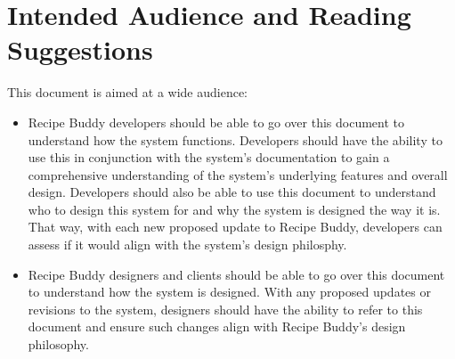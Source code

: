 \documentclass{scrreprt}
\begin{document}
\section{Intended Audience and Reading Suggestions}
$ $This document is aimed at a wide audience:
\begin{itemize}
    \item Recipe Buddy developers should be able to go over this document to understand how the system functions.
          Developers should have the ability to use this in conjunction with the system's documentation to gain a comprehensive understanding of the system's underlying features and overall design.
          Developers should also be able to use this document to understand who to design this system for and why the system is designed the way it is.
          That way, with each new proposed update to Recipe Buddy, developers can assess if it would align with the system's design philosphy.
    \item Recipe Buddy designers and clients should be able to go over this document to understand how the system is designed.
          With any proposed updates or revisions to the system, designers should have the ability to refer to this document and ensure such changes align with Recipe Buddy's design philosophy.
\end{itemize}
$ $
\end{document}
